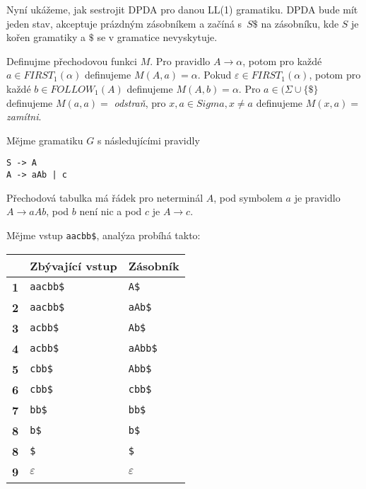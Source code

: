 Nyní ukážeme, jak sestrojit DPDA pro danou LL(1) gramatiku.
DPDA bude mít jeden stav, akceptuje prázdným zásobníkem
a začíná s~$S\$$ na zásobníku, kde $S$ je kořen
gramatiky a $\$$ se v gramatice nevyskytuje.

Definujme přechodovou funkci $M$.
Pro pravidlo $A \to \alpha$, potom pro každé $a \in FIRST_1(\alpha)$
definujeme $M(A, a) = \alpha$. Pokud $\varepsilon \in FIRST_1(\alpha)$,
potom pro každé $b \in FOLLOW_1(A)$ definujeme $M(A,b) = \alpha$.
Pro $a \in (\Sigma \cup \{ \$ \}$ definujeme $M(a,a) =$ {\em odstraň},
pro $x, a \in Sigma, x \neq a$ definujeme $M(x, a) =$ {\em zamítni}.


\begin{example}
Mějme gramatiku $G$ s následujícími pravidly
\begin{verbatim}
S -> A
A -> aAb | c
\end{verbatim}
Přechodová tabulka má řádek pro neterminál $A$,
pod symbolem $a$ je pravidlo $A \to aAb$, pod $b$ není nic a pod $c$ je
$A \to c$.


Mějme vstup \verb|aacbb$|, analýza probíhá takto:

\medskip
\centering
\begin{tabular}{|l|l|l|}
\hline
           & \textbf{Zbývající vstup} & \textbf{Zásobník}    \\ \hline
\textbf{1} & \verb|aacbb$|                  & \verb|A$|      \\ \hline
\textbf{2} & \verb|aacbb$|                  & \verb|aAb$|    \\ \hline
\textbf{3} & \verb|acbb$|                   & \verb|Ab$|     \\ \hline
\textbf{4} & \verb|acbb$|                   & \verb|aAbb$|   \\ \hline
\textbf{5} & \verb|cbb$|                    & \verb|Abb$|    \\ \hline
\textbf{6} & \verb|cbb$|                    & \verb|cbb$|    \\ \hline
\textbf{7} & \verb|bb$|                     & \verb|bb$|     \\ \hline
\textbf{8} & \verb|b$|                      & \verb|b$|      \\ \hline
\textbf{8} & \verb|$|                       & \verb|$|       \\ \hline
\textbf{9} & $\varepsilon$                              & $\varepsilon$          \\ \hline
\end{tabular}
\end{example}


